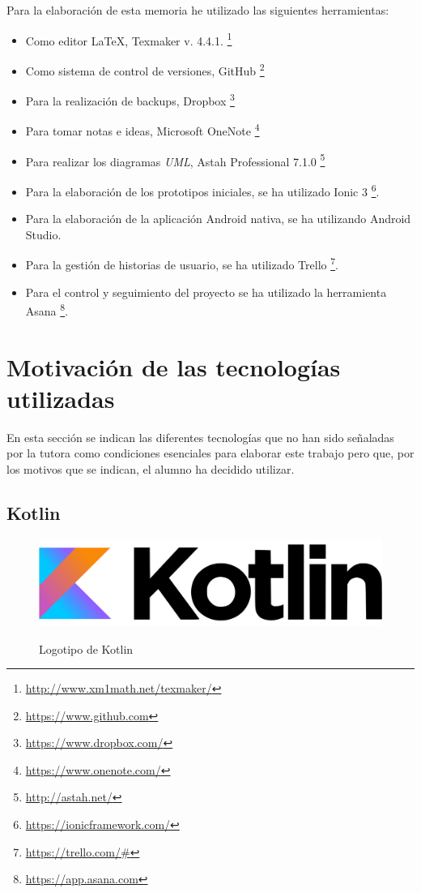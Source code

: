 \documentclass[twoside]{report}
\begin{document}
Para la elaboración de esta memoria he utilizado las siguientes herramientas:
\begin{itemize}
\item Como editor \LaTeX , Texmaker v. 4.4.1. \footnote{\url{http://www.xm1math.net/texmaker/}}
\item Como sistema de control de versiones, GitHub \footnote{\url{https://www.github.com}}
\item Para la realización de backups, Dropbox \footnote{\url{https://www.dropbox.com/}}
\item Para tomar notas e ideas, Microsoft OneNote \footnote{\url{https://www.onenote.com/}}
\item Para realizar los diagramas \textit{UML}, Astah Professional 7.1.0  \footnote{\url{http://astah.net/}}
\item Para la elaboración de los prototipos iniciales, se ha utilizado Ionic 3 \footnote{\url{https://ionicframework.com/}}.
\item Para la elaboración de la aplicación Android nativa, se ha utilizando Android Studio.
\item Para la gestión de historias de usuario, se ha utilizado Trello \footnote{\url{https://trello.com/#}}.
\item Para el control y seguimiento del proyecto se ha utilizado la herramienta Asana \footnote{\url{https://app.asana.com}}.
\end{itemize}

\section{Motivación de las tecnologías utilizadas}
En esta sección se indican las diferentes tecnologías que no han sido señaladas por la tutora como condiciones esenciales para elaborar este trabajo pero que, por los motivos que se indican, el alumno ha decidido utilizar.

\subsection{Kotlin}

\begin{figure}[H]
\centering
\includegraphics[scale=0.3]{images/kotlin}\\
\caption{Logotipo de Kotlin} \cite{kotlin}
\end{figure}
\end{document}
